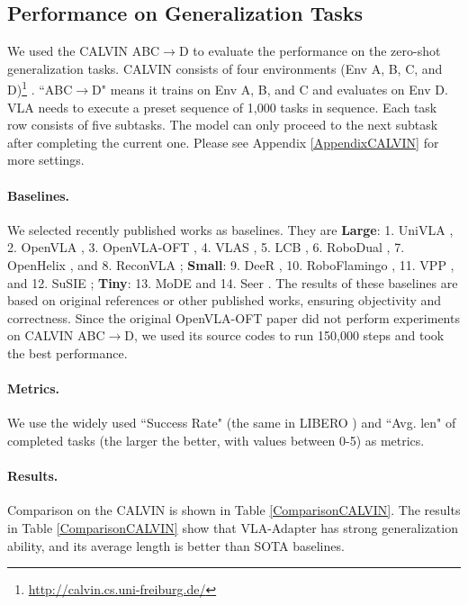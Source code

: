\subsection{Performance on Generalization Tasks}\label{sec43}
We used the CALVIN ABC$\to$D \citep{CALVIN-2022} to evaluate the performance on the zero-shot generalization tasks. CALVIN consists of four environments (Env A, B, C, and D)\footnote{\url{http://calvin.cs.uni-freiburg.de/}}
. ``ABC$\to$D" means it trains on Env A, B, and C and evaluates on Env D. VLA needs to execute a preset sequence of 1,000 tasks in sequence. Each task row consists of five subtasks. The model can only proceed to the next subtask after completing the current one. Please see Appendix \ref{AppendixCALVIN} for more settings. 

\paragraph{Baselines.}\label{Generalizationtask_baselines} 

We selected recently published works as baselines. They are \textbf{Large}: 1. UniVLA \citep{UniVLA-2025}, 2. OpenVLA \citep{OpenVLA-2024}, 3. OpenVLA-OFT \citep{OpenVLA-OFT-2025}, 4. VLAS \citep{VLAS-2025}, 5. LCB \citep{LCB-2024}, 6. RoboDual \citep{RoboDual-2024}, 7. OpenHelix \citep{OpenHelix-2025}, and 8. ReconVLA \citep{ReconVLA-2025}; \textbf{Small}: 9. DeeR \citep{DeeR-2024}, 10. RoboFlamingo \citep{RoboFlamingo-2024}, 11. VPP \citep{VPP-2025}, and 12. SuSIE \citep{SuSIE-2024}; \textbf{Tiny}: 13. MoDE \citep{MoDE-2025} and 14. Seer \citep{Seer-2025}. The results of these baselines are based on original references or other published works, ensuring objectivity and correctness. Since the original OpenVLA-OFT paper \citep{OpenVLA-OFT-2025} did not perform experiments on CALVIN ABC$\to$D, we used its source codes to run 150,000 steps and took the best performance.

\paragraph{Metrics.}\label{Generalizationtask_metrics} 
We use the widely used ``Success Rate" (the same in LIBERO \citep{LIBERO-2023}) and ``Avg. len" of completed tasks (the larger the better, with values between 0-5) as metrics.

\paragraph{Results.}\label{Generalizationtask_baselines1} 
Comparison on the CALVIN is shown in Table \ref{ComparisonCALVIN}. The results in Table \ref{ComparisonCALVIN} show that VLA-Adapter has strong generalization ability, and its average length is better than SOTA baselines.

